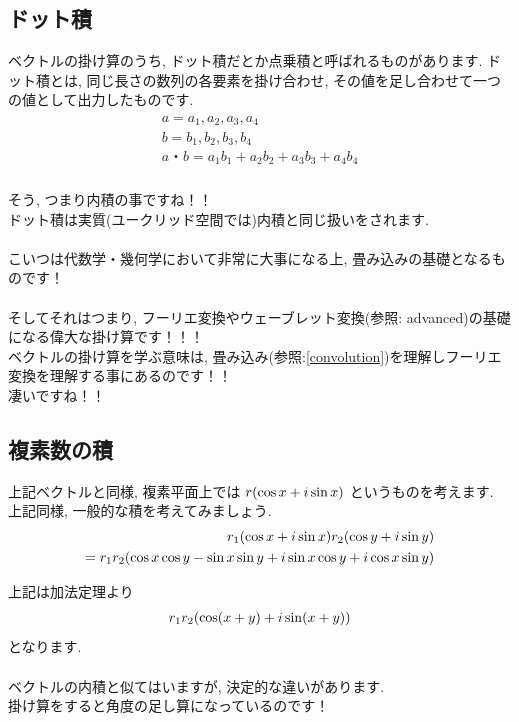\documentclass[11pt,a4paper]{jreport}
\begin{document}
\subsection{ドット積}
ベクトルの掛け算のうち, ドット積だとか点乗積と呼ばれるものがあります.
ドット積とは, 同じ長さの数列の各要素を掛け合わせ, その値を足し合わせて一つの値として出力したものです.\\
\begin{eqnarray}
\begin{split}
a = {a_1,a_2,a_3,a_4}\\
b={b_1,b_2,b_3,b_4}\\
a・b = a_1b_1 + a_2b_2 + a_3b_3 + a_4b_4
\end{split}
\end{eqnarray}
\\
そう, つまり内積の事ですね！！\\
ドット積は実質(ユークリッド空間では)内積と同じ扱いをされます.\\
\\
こいつは代数学・幾何学において非常に大事になる上, 畳み込みの基礎となるものです！\\
\\
そしてそれはつまり, フーリエ変換やウェーブレット変換(参照: advanced)の基礎になる偉大な掛け算です！！！
\\
ベクトルの掛け算を学ぶ意味は, 畳み込み(参照:\ref{convolution})を理解しフーリエ変換を理解する事にあるのです！！\\
凄いですね！！\\

\subsection{複素数の積}
上記ベクトルと同様, 複素平面上では $\mathstrut r (\cos x + \mathstrut i\sin x)$ というものを考えます.\\
上記同様, 一般的な積を考えてみましょう.\\

\begin{eqnarray}
\begin{split}
\mathstrut r_1(\cos x + \mathstrut i\sin x)\mathstrut r_2(\cos y + \mathstrut i\sin y)\\
= \mathstrut r_1\mathstrut r_2(\cos x\cos y - \sin x\sin y + \mathstrut i\sin x \cos y + \mathstrut i\cos x\sin y)
\end{split}
\end{eqnarray}

上記は加法定理より
\begin{eqnarray}
\mathstrut r_1\mathstrut r_2(\cos (\mathstrut x + \mathstrut y) + \mathstrut i\sin (\mathstrut x + \mathstrut y))
\end{eqnarray}
となります.\\
\\
ベクトルの内積と似てはいますが, 決定的な違いがあります.\\
掛け算をすると角度の足し算になっているのです！\\
\end{document}
